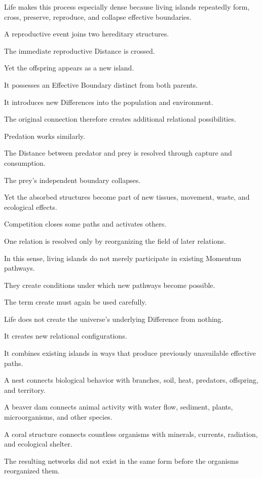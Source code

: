 Life makes this process especially dense because living islands repeatedly form, cross, preserve, reproduce, and collapse effective boundaries.

A reproductive event joins two hereditary structures.

The immediate reproductive Distance is crossed.

Yet the offspring appears as a new island.

It possesses an Effective Boundary distinct from both parents.

It introduces new Differences into the population and environment.

The original connection therefore creates additional relational possibilities.

Predation works similarly.

The Distance between predator and prey is resolved through capture and consumption.

The prey’s independent boundary collapses.

Yet the absorbed structures become part of new tissues, movement, waste, and ecological effects.

Competition closes some paths and activates others.

One relation is resolved only by reorganizing the field of later relations.

In this sense, living islands do not merely participate in existing Momentum pathways.

They create conditions under which new pathways become possible.

The term create must again be used carefully.

Life does not create the universe’s underlying Difference from nothing.

It creates new relational configurations.

It combines existing islands in ways that produce previously unavailable effective paths.

A nest connects biological behavior with branches, soil, heat, predators, offspring, and territory.

A beaver dam connects animal activity with water flow, sediment, plants, microorganisms, and other species.

A coral structure connects countless organisms with minerals, currents, radiation, and ecological shelter.

The resulting networks did not exist in the same form before the organisms reorganized them.

